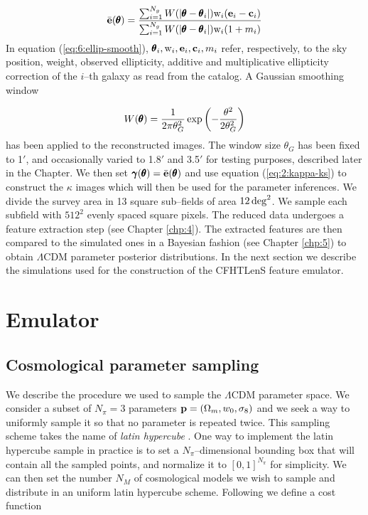 \begin{equation}
\label{eq:6:ellip-smooth}
\bar{\mathbf{e}}(\pmb{\theta}) = \frac{\sum_{i=1}^{N_g}W(\vert\pmb{\theta}-\pmb{\theta}_i\vert){\rm w}_i(\mathbf{e}_i -\mathbf{c}_i)}{\sum_{i=1}^{N_g}W(\vert\pmb{\theta}-\pmb{\theta}_i\vert){\rm w}_i(1+m_i)}
\end{equation}
%
In equation (\ref{eq:6:ellip-smooth}), $\pmb{\theta}_i,{\rm w}_i,\mathbf{e}_i,\mathbf{c}_i,m_i$ refer, respectively, to the sky position, weight, observed ellipticity, additive and multiplicative ellipticity correction of the $i$--th galaxy as read from the catalog. A Gaussian smoothing window

\begin{equation}
\label{eq:6:gausswin}
W(\pmb{\theta}) = \frac{1}{2\pi\theta_G^2}\exp\left(-\frac{\theta^2}{2\theta_G^2}\right)
\end{equation}
%
has been applied to the reconstructed images. The window size $\theta_G$ has been fixed to 1$'$, and occasionally varied to 1.8$'$ and 3.5$'$ for testing purposes, described later in the Chapter. We then set $\pmb{\gamma}(\pmb{\theta})=\bar{\mathbf{e}}(\pmb{\theta})$ and use equation (\ref{eq:2:kappa-ks}) to construct the $\kappa$ images which will then be used for the parameter inferences. We divide the survey area in 13 square sub--fields of area $12\,{\rm deg}^2$. We sample each subfield with $512^2$ evenly spaced square pixels. The reduced data undergoes a feature extraction step (see Chapter \ref{chp:4}). The extracted features are then compared to the simulated ones in a Bayesian fashion (see Chapter \ref{chp:5}) to obtain $\Lambda$CDM parameter posterior distributions. In the next section we describe the simulations used for the construction of the CFHTLenS feature emulator.      

\section{Emulator}

\subsection{Cosmological parameter sampling}
\label{sec:6:sampling}
We describe the procedure we used to sample the $\Lambda$CDM parameter space. We consider a subset of $N_\pi=3$ parameters $\mathbf{p}=(\Omega_m,w_0,\sigma_8)$ and we seek a way to uniformly sample it so that no parameter is repeated twice. This sampling scheme takes the name of \textit{latin hypercube} \citep{Coyote2}. One way to implement the latin hypercube sample in practice is to set a $N_\pi$--dimensional bounding box that will contain all the sampled points, and normalize it to $[0,1]^{N_\pi}$ for simplicity. We can then set the number $N_M$ of cosmological models we wish to sample and distribute in an uniform latin hypercube scheme. Following \citep{Coyote2,PetriCFHTMink} we define a cost function 

